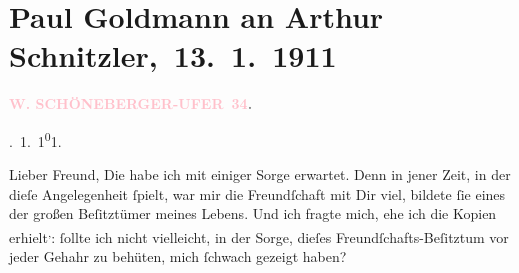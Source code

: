 

\renewcommand{\erwaehntePersonen}{Personen: Franz Grillparzer, Louise Schnitzler}
\renewcommand{\erwaehnteOrte}{Orte: Berlin, Deutsches Theater Berlin, Frankgasse, Schöneberger Ufer, Welsberg-Taisten, Wien}
\renewcommand{\erwaehnteWerke}{Werke: Anatol, Aus dem dramatischen Irrgarten. Polemische Aufsätze über Berliner Theateraufführungen, Berliner Theater. (»Der Schleier der Beatrice« von Arthur Schnitzler.), Berliner Theater. (»Lebendige Stunden« von Arthur Schnitzler.), Berliner Theater. »Der Ruf des Lebens« von Arthur Schnitzler, Berliner Theater. »Der einsame Weg«. Von Arthur Schnitzler, Der Ruf des Lebens. Schauspiel in drei Akten, Der Schleier der Beatrice. Schauspiel in fünf Akten, Der einsame Weg. Schauspiel in fünf Akten, Die »neue Richtung«. Polemische Aufsätze über Berliner Theater-Aufführungen, Lebendige Stunden. Vier Einakter, Literatenstücke und Ausstattungsregie. Polemische Aufsätze über Berliner Theater-Aufführungen, Literatur, Neue Freie Presse, Vom Rückgang der deutschen Bühne. Polemische Aufsätze über Berliner Theater-Aufführungen}
\section[ Paul Goldmann an Arthur Schnitzler, 13. 1. 1911]{Paul Goldmann an Arthur Schnitzler, 13. 1. 1911}
\nopagebreak{}
\rehead{ }\normalsize\beginnumbering{}
\toendnotes[C]{\smallbreak\pagebreak[2]}
\toendnotes[C]{\smallbreak}
\pstart
           \noindent{}\raggedleft{}{\pb}\textcolor{gray}{\textbf{\textcolor{pink}{W. SCHÖNEBERGER-UFER 34}{}\ledrightnote{\textcolor{pink}{Schöneberger Ufer}}.}}\pend
           
. 1. 1\substVorne{}\textsuperscript{0}\substDazwischen{}1\substHinten{}.\pend
           
\pstart\center{}Lieber Freund,\pend
\pstart
           Die \label{K_L03475-1v}\label{K_L03475-1h} habe ich mit einiger Sorge erwartet. Denn in jener Zeit, in der dieſe
               Angelegenheit ſpielt, war mir die Freundſchaft mit Dir  viel, bildete ſie eines der großen Beſitztümer meines Lebens. Und ich
               fragte mich, ehe ich die Kopien erhielt\substVorne{}\textsuperscript{,}\substDazwischen{}:\substHinten{} ſollte ich nicht vielleicht, in der Sorge, dieſes Freundſchafts-Beſitztum
               vor jeder Gehahr zu behüten, mich ſchwach gezeigt haben?\pend
           
